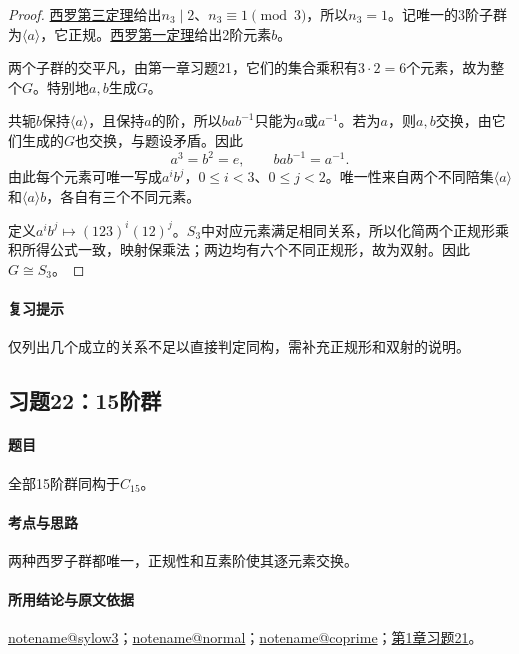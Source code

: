 \documentclass[UTF8,a4paper,11pt,fontset=windows]{ctexart}
\makeatletter
\newcommand{\noteref}[1]{\hyperref[note:#1]{\csname notename@#1\endcsname}}
\newcommand{\proofref}[2]{\hyperref[note:#1]{#2}}
\newcommand{\exref}[2]{\hyperref[ex:#1:#2]{第#1章习题#2}}
\makeatother
\begin{document}

\begin{proof}
\proofref{sylow3}{西罗第三定理}给出$n_3\mid2$、$n_3\equiv1\pmod3$，所以$n_3=1$。记唯一的3阶子群为$\langle a\rangle$，它正规。\proofref{sylow1}{西罗第一定理}给出2阶元素$b$。

两个子群的交平凡，由第一章习题21，它们的集合乘积有$3\cdot2=6$个元素，故为整个$G$。特别地$a,b$生成$G$。

共轭$b$保持$\langle a\rangle$，且保持$a$的阶，所以$bab^{-1}$只能为$a$或$a^{-1}$。若为$a$，则$a,b$交换，由它们生成的$G$也交换，与题设矛盾。因此
\[
a^3=b^2=e,\qquad bab^{-1}=a^{-1}.
\]
由此每个元素可唯一写成$a^ib^j$，$0\leq i<3$、$0\leq j<2$。唯一性来自两个不同陪集$\langle a\rangle$和$\langle a\rangle b$，各自有三个不同元素。

定义$a^ib^j\mapsto(123)^i(12)^j$。$S_3$中对应元素满足相同关系，所以化简两个正规形乘积所得公式一致，映射保乘法；两边均有六个不同正规形，故为双射。因此$G\cong S_3$。
\end{proof}

\paragraph{复习提示}
仅列出几个成立的关系不足以直接判定同构，需补充正规形和双射的说明。


\subsection{习题22：\texorpdfstring{15阶群}{15阶群}}
\label{ex:2:22}

\paragraph{题目}
全部15阶群同构于$C_{15}$。

\paragraph{考点与思路}
两种西罗子群都唯一，正规性和互素阶使其逐元素交换。

\paragraph{所用结论与原文依据}
\noteref{sylow3}；\noteref{normal}；\noteref{coprime}；\exref{1}{21}。

\end{document}
